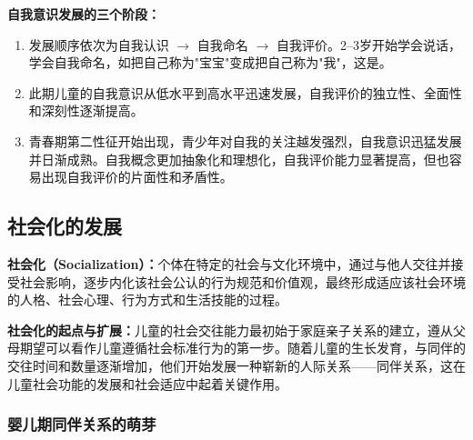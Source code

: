\begin{keybox}
\textbf{自我意识发展的三个阶段：}

\begin{enumerate}[leftmargin=*]
    \item {}发展顺序依次为自我认识 $\to$ 自我命名 $\to$ 自我评价。2--3岁开始学会说话，学会自我命名，如把自己称为"宝宝"变成把自己称为"我"，这是。

    \item {}此期儿童的自我意识从低水平到高水平迅速发展，自我评价的独立性、全面性和深刻性逐渐提高。

    \item {}青春期第二性征开始出现，青少年对自我的关注越发强烈，自我意识迅猛发展并日渐成熟。自我概念更加抽象化和理想化，自我评价能力显著提高，但也容易出现自我评价的片面性和矛盾性。
\end{enumerate}
\end{keybox}

\subsection{社会化的发展}

\begin{defbox}
\textbf{社会化（Socialization）：}个体在特定的社会与文化环境中，通过与他人交往并接受社会影响，逐步内化该社会公认的行为规范和价值观，最终形成适应该社会环境的人格、社会心理、行为方式和生活技能的过程。

\textbf{社会化的起点与扩展：}儿童的社会交往能力最初始于家庭亲子关系的建立，遵从父母期望可以看作儿童遵循社会标准行为的第一步。随着儿童的生长发育，与同伴的交往时间和数量逐渐增加，他们开始发展一种崭新的人际关系——同伴关系，这在儿童社会功能的发展和社会适应中起着关键作用。
\end{defbox}

\subsubsection{婴儿期同伴关系的萌芽}

